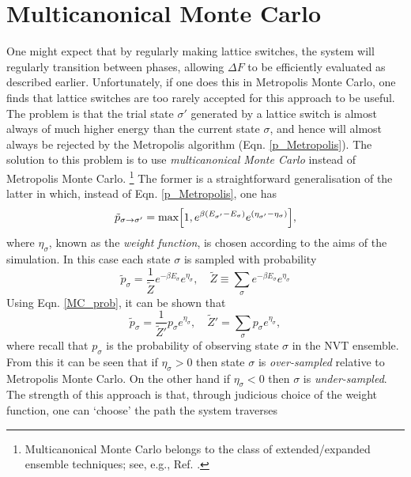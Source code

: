 \documentclass{report}
\begin{document}
\section{Multicanonical Monte Carlo}
One might expect that by regularly making lattice switches, the system will regularly transition between phases, allowing $\Delta F$ to be efficiently 
evaluated as described earlier. Unfortunately, if one does this in Metropolis Monte Carlo, one finds that lattice switches are too rarely accepted for 
this approach to be useful. 
The problem is that the trial state $\sigma'$ generated by a lattice switch is almost always of much higher energy than the current state $\sigma$, 
and hence will almost always be rejected by the Metropolis algorithm (Eqn. \eqref{p_Metropolis}). 
The solution to this problem is to use \emph{multicanonical Monte Carlo}\cite{Berg_1991,Berg_1992,Smith_1995} instead of Metropolis Monte Carlo.
\footnote{Multicanonical Monte Carlo belongs to the class of extended/expanded ensemble techniques; see, e.g., Ref. \cite{Iba_2001}.}
The former is a straightforward generalisation of the latter in which, instead of Eqn. \eqref{p_Metropolis}, one has
\begin{equation}\label{p_multicanonical}
\tilde{p}_{\sigma\to\sigma'}=\text{max}\Bigl[1,e^{\beta(E_{\sigma'}-E_{\sigma})}e^{(\eta_{\sigma'}-\eta_{\sigma})}\Bigr],
\end{equation}
where $\eta_{\sigma}$, known as the \emph{weight function}, is chosen according to the aims of the simulation. In this case each state $\sigma$ is 
sampled with probability
\begin{equation}\label{MCMC_prob}
\tilde{p}_{\sigma}=\frac{1}{\tilde{Z}}e^{-\beta E_{\sigma}}e^{\eta_{\sigma}}, \quad \tilde{Z}\equiv\sum_{\sigma}e^{-\beta E_{\sigma}}e^{\eta_{\sigma}}
\end{equation}
Using Eqn. \eqref{MC_prob}, it can be shown that
\begin{equation}\label{MCMC_prob_2}
\tilde{p}_{\sigma}=\frac{1}{\tilde{Z}'}p_{\sigma}e^{\eta_{\sigma}}, \quad \tilde{Z}'=\sum_{\sigma}p_{\sigma}e^{\eta_{\sigma}},
\end{equation}
where recall that $p_{\sigma}$ is the probability of observing state $\sigma$ in the NVT ensemble. From this it can be seen that if 
$\eta_{\sigma}>0$ then state $\sigma$ is \emph{over-sampled} relative to Metropolis Monte Carlo. On the other hand if $\eta_{\sigma}<0$ then 
$\sigma$ is \emph{under-sampled}. 
The strength of this approach is that, through judicious choice of the weight function, one can `choose' the path the system traverses 
\end{document}
